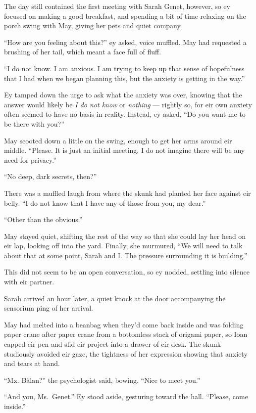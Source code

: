The day still contained the first meeting with Sarah Genet, however, so ey focused on making a good breakfast, and spending a bit of time relaxing on the porch swing with May, giving her pets and quiet company.

``How are you feeling about this?'' ey asked, voice muffled. May had requested a brushing of her tail, which meant a face full of fluff.

``I do not know. I am anxious. I am trying to keep up that sense of hopefulness that I had when we began planning this, but the anxiety is getting in the way.''

Ey tamped down the urge to ask what the anxiety was over, knowing that the answer would likely be \emph{I do not know} or \emph{nothing} — rightly so, for eir own anxiety often seemed to have no basis in reality. Instead, ey asked, ``Do you want me to be there with you?''

May scooted down a little on the swing, enough to get her arms around eir middle. ``Please. It is just an initial meeting, I do not imagine there will be any need for privacy.''

``No deep, dark secrets, then?''

There was a muffled laugh from where the skunk had planted her face against eir belly. ``I do not know that I have any of those from you, my dear.''

``Other than the obvious.''

May stayed quiet, shifting the rest of the way so that she could lay her head on eir lap, looking off into the yard. Finally, she murmured, ``We will need to talk about that at some point, Sarah and I. The pressure surrounding it is building.''

This did not seem to be an open conversation, so ey nodded, settling into silence with eir partner.

Sarah arrived an hour later, a quiet knock at the door accompanying the sensorium ping of her arrival.

May had melted into a beanbag when they'd come back inside and was folding paper crane after paper crane from a bottomless stack of origami paper, so Ioan capped eir pen and slid eir project into a drawer of eir desk. The skunk studiously avoided eir gaze, the tightness of her expression showing that anxiety and tears at hand.

``Mx. Bălan?'' the psychologist said, bowing. ``Nice to meet you.''

``And you, Ms.~Genet.'' Ey stood aside, gesturing toward the hall. ``Please, come inside.''

